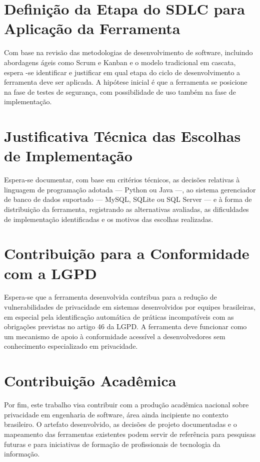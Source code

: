 \documentclass[oneside]{normas-utf-tex}
\begin{document}
\section{Definição da Etapa do SDLC para Aplicação da Ferramenta}

Com base na revisão das metodologias de desenvolvimento de software, incluindo abordagens ágeis como Scrum e Kanban e o modelo tradicional em cascata, espera -se identificar e justificar em qual etapa do ciclo de desenvolvimento a ferramenta deve ser aplicada. A hipótese inicial é que a ferramenta se posicione na fase de testes de segurança, com possibilidade de uso também na fase de implementação.

\section{Justificativa Técnica das Escolhas de Implementação}

Espera-se documentar, com base em critérios técnicos, as decisões relativas à linguagem de programação adotada — Python ou Java —, ao sistema gerenciador de banco de dados suportado — MySQL, SQLite ou SQL Server — e à forma de distribuição da ferramenta, registrando as alternativas avaliadas, as dificuldades de implementação identificadas e os motivos das escolhas realizadas.

\section{Contribuição para a Conformidade com a LGPD}

Espera-se que a ferramenta desenvolvida contribua para a redução de vulnerabilidades de privacidade em sistemas desenvolvidos por equipes brasileiras, em especial pela identificação automática de práticas incompatíveis com as obrigações previstas no artigo 46 da LGPD. A ferramenta deve funcionar como um mecanismo de apoio à conformidade acessível a desenvolvedores sem conhecimento especializado em privacidade.

\section{Contribuição Acadêmica}

Por fim, este trabalho visa contribuir com a produção acadêmica nacional sobre privacidade em engenharia de software, área ainda incipiente no contexto brasileiro. O artefato desenvolvido, as decisões de projeto documentadas e o mapeamento das ferramentas existentes podem servir de referência para pesquisas futuras e para iniciativas de formação de profissionais de tecnologia da informação.
\end{document}
